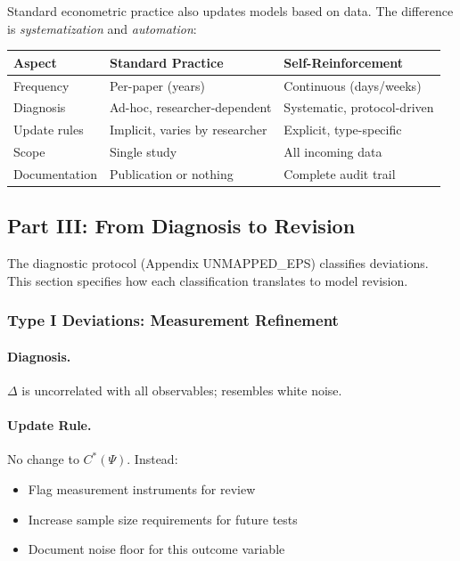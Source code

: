 Standard econometric practice also updates models based on data. The difference 
is \emph{systematization} and \emph{automation}:

\begin{center}
\renewcommand{\arraystretch}{1.3}
\begin{tabular}{|l|p{5cm}|p{5cm}|}
\hline
\textbf{Aspect} & \textbf{Standard Practice} & \textbf{Self-Reinforcement} \\
\hline
Frequency & Per-paper (years) & Continuous (days/weeks) \\
Diagnosis & Ad-hoc, researcher-dependent & Systematic, protocol-driven \\
Update rules & Implicit, varies by researcher & Explicit, type-specific \\
Scope & Single study & All incoming data \\
Documentation & Publication or nothing & Complete audit trail \\
\hline
\end{tabular}
\end{center}

\subsection{Part III: From Diagnosis to Revision}

The diagnostic protocol (Appendix UNMAPPED_EPS) classifies deviations. This section 
specifies how each classification translates to model revision.

\subsubsection{Type I Deviations: Measurement Refinement}

\paragraph{Diagnosis.}
$\Delta$ is uncorrelated with all observables; resembles white noise.

\paragraph{Update Rule.}
No change to $C^*(\Psi)$. Instead:
\begin{itemize}
    \item Flag measurement instruments for review
    \item Increase sample size requirements for future tests
    \item Document noise floor for this outcome variable
\end{itemize}

